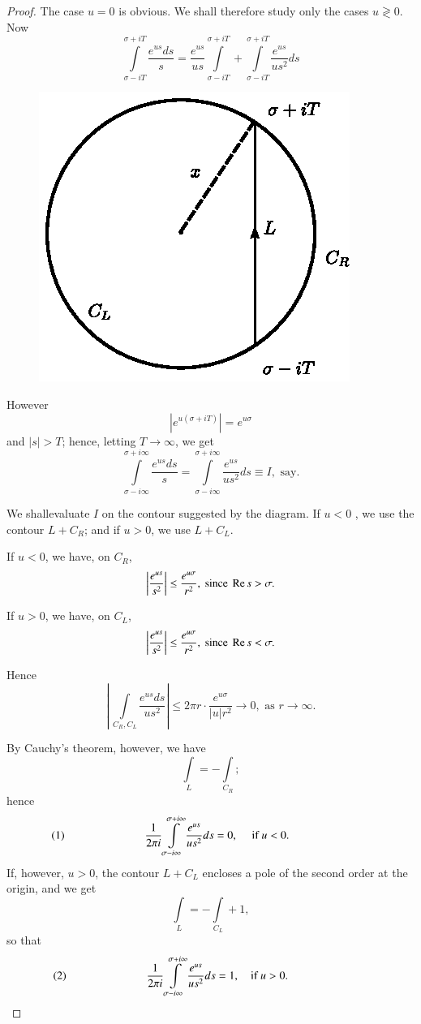 \begin{proof}
The case $u=0$ is obvious. We shall therefore study only the cases $u
\gtrless 0$. Now
$$
\int\limits^{\sigma + i T}_{\sigma - i T} \frac{e^{us}ds}{s}
=\frac{e^{us}}{us} \int\limits^{\sigma + i T}_{\sigma - i T} +
\int\limits^{\sigma+iT}_{\sigma - iT} \frac{e^{us}}{us^2} ds 
$$ 
\begin{figure}[H]
\centering
\includegraphics{figures/fig1.eps}
\end{figure}

However
$$
|e^{u(\sigma + i T)}| = e^{u\sigma}
$$
and $|s|>T$; hence, letting $T \to \infty$, we get
$$
\int\limits^{\sigma + i \infty}_{\sigma-i\infty} \frac{e^{us}ds}{s} =
\int\limits^{\sigma + i \infty}_{\sigma - i \infty}
\frac{e^{us}}{us^2} ds \equiv I, \text{ say}.
$$

We shall\pageoriginale evaluate $I$ on the contour suggested by the
diagram. If $u <0$ , we use the contour $L + C_R$; and if $u>0$, we
use $L+C_L$.

If $u<0$, we have, on $C_R$,
$$
\left|\frac{e^{us}}{s^2} \right| \leq \frac{e^{u\sigma}}{r^2}, \text{
  since } \operatorname{Re} s > \sigma. 
$$

If $u>0$, we have, on $C_L$,
$$
\left|\frac{e^{us}}{s^2} \right| \leq \frac{e^{u\sigma}}{r^2}, \text{
  since }\operatorname{Re} s < \sigma.
$$

Hence
$$
\left|\, \int\limits_{C_R, C_L} \frac{e^{us} ds}{us^2}
\right| \leq 2 \pi r \cdot \frac{e^{u\sigma}}{|u|r^2} \to 0,
\text{ as } r \to \infty.
$$

By Cauchy's theorem, however, we have
$$
\int\limits_L = - \int\limits_{C_R};
$$
hence
$$
(1) \hspace{2.5cm} \frac{1}{2\pi i} \int\limits^{\sigma + i \infty}_{\sigma - i
  \infty} \frac{e^{us}}{us^2} ds = 0, \quad \text{ if } u < 0. \hspace{2.5cm}
$$
If, however, $u>0$, the contour $L + C_L$ encloses a pole of the
second order at the origin, and we get
$$
\int\limits_L = - \int\limits_{C_L} + 1, 
$$
so that
$$
(2) \hspace{2.5cm} \frac{1}{2\pi i} \int\limits^{\sigma + i
  \infty}_{\sigma - i   \infty} \frac{e^{us}}{us^2} ds = 1, \quad
\text{if } u > 0. \hspace{2.5cm}
$$
\end{proof}

